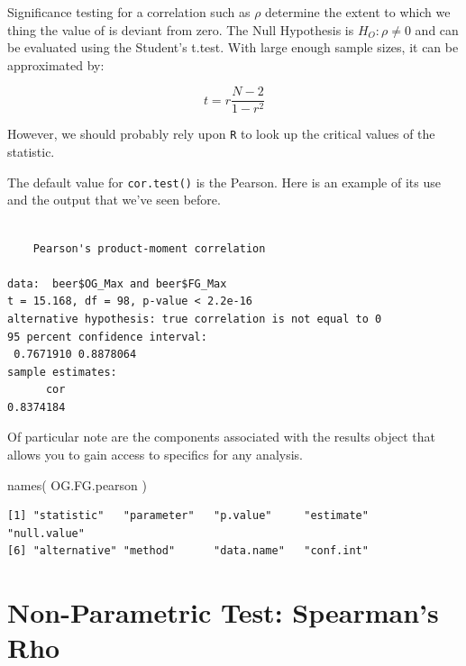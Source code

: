\documentclass[
  letterpaper,
]{book}
\newenvironment{Shaded}{\begin{snugshade}}{\end{snugshade}}
\newcommand{\FunctionTok}[1]{\textcolor[rgb]{0.28,0.35,0.67}{#1}}
\newcommand{\NormalTok}[1]{\textcolor[rgb]{0.00,0.23,0.31}{#1}}
\newcommand{\OtherTok}[1]{\textcolor[rgb]{0.00,0.23,0.31}{#1}}
\newcommand{\SpecialCharTok}[1]{\textcolor[rgb]{0.37,0.37,0.37}{#1}}
\begin{document}
Significance testing for a correlation such as \(\rho\) determine the
extent to which we thing the value of is deviant from zero. The Null
Hypothesis is \(H_O: \rho \ne 0\) and can be evaluated using the
Student's t.test. With large enough sample sizes, it can be approximated
by:

\[
t = r \frac{N-2}{1-r^2}
\]

However, we should probably rely upon \texttt{R} to look up the critical
values of the statistic.

The default value for \texttt{cor.test()} is the Pearson. Here is an
example of its use and the output that we've seen before.

\begin{Shaded}
\end{Shaded}

\begin{verbatim}

    Pearson's product-moment correlation

data:  beer$OG_Max and beer$FG_Max
t = 15.168, df = 98, p-value < 2.2e-16
alternative hypothesis: true correlation is not equal to 0
95 percent confidence interval:
 0.7671910 0.8878064
sample estimates:
      cor 
0.8374184 
\end{verbatim}

Of particular note are the components associated with the results object
that allows you to gain access to specifics for any analysis.

\begin{Shaded}
\begin{Highlighting}[]
\FunctionTok{names}\NormalTok{( OG.FG.pearson )}
\end{Highlighting}
\end{Shaded}

\begin{verbatim}
[1] "statistic"   "parameter"   "p.value"     "estimate"    "null.value" 
[6] "alternative" "method"      "data.name"   "conf.int"   
\end{verbatim}

\section{Non-Parametric Test: Spearman's
Rho}\label{non-parametric-test-spearmans-rho}
\end{document}
